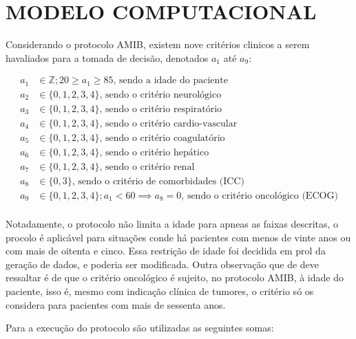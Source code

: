 \documentclass[12pt]{article}
\begin{document}
\section{MODELO COMPUTACIONAL}

Considerando o protocolo AMIB, existem nove critérios clinicos a serem havaliados para a tomada de decisão, denotados $a_1$ até $a_9$:

\[
    \begin{split}
        a_1 &\in \mathbb{Z}; 20 \ge a_1 \ge 85\text{, sendo a idade do paciente} \\
        a_2 &\in \{0, 1, 2, 3, 4\}\text{, sendo o critério neurológico} \\
        a_3 &\in \{0, 1, 2, 3, 4\}\text{, sendo o critério respiratório} \\
        a_4 &\in \{0, 1, 2, 3, 4\}\text{, sendo o critério cardio-vascular} \\
        a_5 &\in \{0, 1, 2, 3, 4\}\text{, sendo o critério coagulatório} \\
        a_6 &\in \{0, 1, 2, 3, 4\}\text{, sendo o critério hepático} \\
        a_7 &\in \{0, 1, 2, 3, 4\}\text{, sendo o critério renal} \\
        a_8 &\in \{0, 3\}\text{, sendo o critério de comorbidades (ICC)} \\
        a_9 &\in \{0, 1, 2, 3, 4\}; a_1 < 60 \implies a_8=0\text{, sendo o critério oncológico (ECOG)} \\
    \end{split}
\] 

Notadamente, o protocolo não limita a idade para apneas as faixas descritas, o procolo é aplicável para situações conde há pacientes com menos de vinte anos ou com mais de oitenta e cinco.
Essa restrição de idade foi decidida em prol da geração de dados, e poderia ser modificada.
Outra observação que de deve ressaltar é de que o critério oncológico é sujeito, no protocolo AMIB, à idade do paciente, isso é, mesmo com indicação clínica de tumores, o critério só os considera para pacientes com mais de sessenta anos.

Para a execução do protocolo são utilizadas as seguintes somas:
\end{document}
